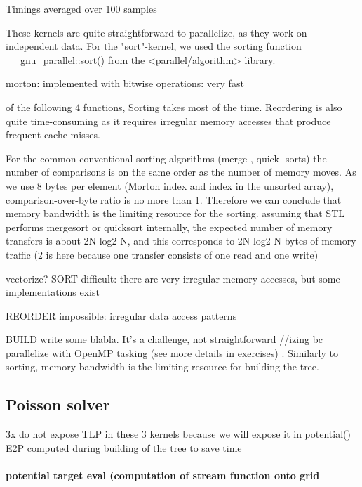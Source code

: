 \documentclass[a4paper,12pt,twoside]{article}
\begin{document}
\begin{figure}[H]

\end{figure}
Timings averaged over 100 samples 


These kernels are quite straightforward to parallelize, as they work on independent data. For the "sort"-kernel, we used the sorting function \_\_gnu\_parallel::sort() from the <parallel/algorithm> library.

morton: implemented with bitwise operations: very fast

of the following 4 functions, Sorting takes most of the time. Reordering is also quite time-consuming as it requires irregular memory accesses that produce frequent cache-misses.

For the common conventional sorting algorithms (merge-, quick- sorts) the number of comparisons is on the same order as the number of memory moves. As we use 8 bytes per element (Morton index and index in the unsorted array), comparison-over-byte ratio is no more than 1. Therefore we can conclude that memory bandwidth is the limiting resource for the sorting. assuming that STL performs mergesort or quicksort internally, the expected number of memory transfers is about 2N log2 N, and this corresponds to 2N log2 N bytes of memory traffic (2 is here because one transfer consists of one read and one write)

vectorize?
SORT difficult: there are very irregular memory accesses, but some implementations exist 

REORDER impossible: irregular data access patterns 

BUILD 
write some blabla. It's a challenge, not straightforward //izing bc 
parallelize with OpenMP tasking (see more details in exercises) . Similarly to sorting, memory bandwidth is the limiting resource for building the tree.

\subsection{Poisson solver}

3x do not expose TLP in these 3 kernels
because we will expose it in potential()
E2P computed during building of the tree to save time

\paragraph{potential target eval (computation of stream function onto grid}
\end{document}
